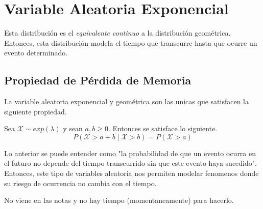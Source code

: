 \section{Variable Aleatoria Exponencial}
Esta distribución es el \textit{equivalente continuo} a la distribución geométrica. Entonces, esta distribución modela el tiempo que transcurre hasta que ocurre un evento determinado.


\subsection{Propiedad de Pérdida de Memoria}

La variable aleatoria exponencial y geométrica son las unicas que satisfacen la siguiente propiedad.

Sea $\mathcal X \sim exp(\lambda)$ y sean $a,b \ge 0$. Entonces se satisface lo siguiente.
\[P(\mathcal X > a + b \mid \mathcal X > b) = P(\mathcal X > a)\]

Lo anterior se puede entender como "la probabilidad de que un evento ocurra en el futuro no depende del tiempo transcurrido sin que este evento haya sucedido". Entonces, este tipo de variables aleatoria nos permiten modelar fenomenos donde su riesgo de ocurrencia no cambia con el tiempo.



\begin{myproof}
  No viene en las notas y no hay tiempo (momentaneamente) para hacerlo.
\end{myproof}


